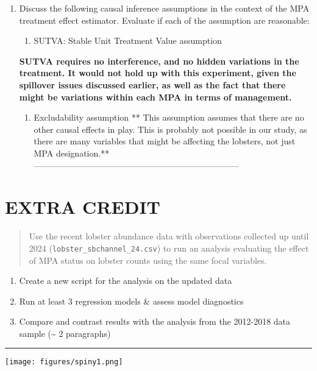 \documentclass[
]{article}
\providecommand{\tightlist}{%
  \setlength{\itemsep}{0pt}\setlength{\parskip}{0pt}}
\begin{document}
\begin{enumerate}
\def\labelenumi{\alph{enumi}.}
\setcounter{enumi}{3}
\item
  Discuss the following causal inference assumptions in the context of
  the MPA treatment effect estimator. Evaluate if each of the assumption
  are reasonable:

  \begin{enumerate}
  \def\labelenumii{\arabic{enumii})}
  \tightlist
  \item
    SUTVA: Stable Unit Treatment Value assumption
  \end{enumerate}

  \textbf{SUTVA requires no interference, and no hidden variations in
  the treatment. It would not hold up with this experiment, given the
  spillover issues discussed earlier, as well as the fact that there
  might be variations within each MPA in terms of management.}

  \begin{enumerate}
  \def\labelenumii{\arabic{enumii})}
  \setcounter{enumii}{1}
  \tightlist
  \item
    Excludability assumption ** This assumption assumes that there are
    no other causal effects in play. This is probably not possible in
    our study, as there are many variables that might be affecting the
    lobsters, not just MPA designation.**
    ------------------------------------------------------------------------
  \end{enumerate}
\end{enumerate}

\section{EXTRA CREDIT}\label{extra-credit}

\begin{quote}
Use the recent lobster abundance data with observations collected up
until 2024 (\texttt{lobster\_sbchannel\_24.csv}) to run an analysis
evaluating the effect of MPA status on lobster counts using the same
focal variables.
\end{quote}

\begin{enumerate}
\def\labelenumi{\alph{enumi}.}
\tightlist
\item
  Create a new script for the analysis on the updated data
\item
  Run at least 3 regression models \& assess model diagnostics
\item
  Compare and contrast results with the analysis from the 2012-2018 data
  sample (\textasciitilde{} 2 paragraphs)
\end{enumerate}

\begin{center}\rule{0.5\linewidth}{0.5pt}\end{center}

\texttt{[image: figures/spiny1.png]}
\end{document}
